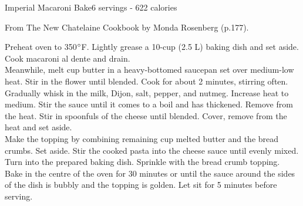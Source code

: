 \begin{recipe}{Imperial Macaroni Bake}{6 servings - 622 calories}{}

\freeform From {\normalfont The New Chatelaine Cookbook} by Monda Rosenberg (p.177).


Preheat oven to 350$\degree$F. Lightly grease a 10-cup (2.5 L) baking dish and set aside. Cook macaroni al dente and drain.\\

Meanwhile, melt  cup butter in a heavy-bottomed saucepan set over medium-low heat. Stir in the flower until blended. Cook for about 2 minutes, stirring often. Gradually whisk in the milk, Dijon, salt, pepper, and nutmeg. Increase heat to medium. Stir the sauce until it comes to a boil and has thickened. Remove from the heat. Stir in spoonfuls of the cheese until blended. Cover, remove from the heat and set aside.\\

Make the topping by combining remaining  cup melted butter and the bread crumbs. Set aside. Stir the cooked pasta into the cheese sauce until evenly mixed. Turn into the prepared baking dish. Sprinkle with the bread crumb topping.\\

Bake in the centre of the oven for 30 minutes or until the sauce around the sides of the dish is bubbly and the topping is golden. Let sit for 5 minutes before serving.

\end{recipe}